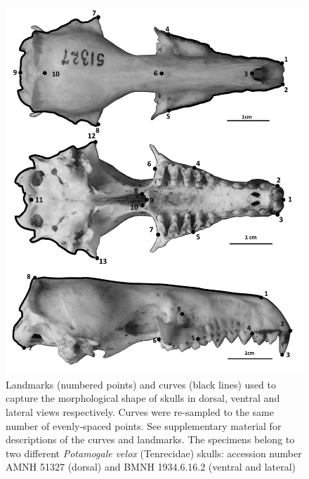 \documentclass[12pt,a4paper]{article}
\begin{document}
	\begin{figure}
	\centering
	\includegraphics[width=1\linewidth]{figures/skdors+skvent+sklat_BW.png}
	
	\caption[Diagram of the landmarks and curves for the skulls in dorsal ventral and lateral views]
		{Landmarks (numbered points) and curves (black lines) used to capture the morphological shape of skulls in dorsal, ventral and lateral views respectively. Curves were re-sampled to the same number of evenly-spaced points. See supplementary material for descriptions of the curves and landmarks. The specimens belong to two different \textit{Potamogale velox} (Tenrecidae) skulls: accession number AMNH 51327 (dorsal) and BMNH 1934.6.16.2 (ventral and lateral)}
	
	\label{fig:skulls_landmarks}
	\end{figure}


\end{document}
